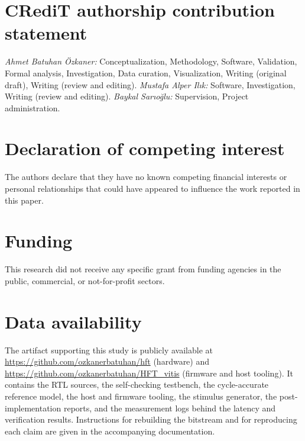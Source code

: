 \documentclass[final,5p,times,twocolumn]{elsarticle}
\begin{document}

\section*{CRediT authorship contribution statement}
\noindent
\textit{Ahmet Batuhan \"Ozkaner:} Conceptualization, Methodology, Software,
Validation, Formal analysis, Investigation, Data curation, Visualization,
Writing (original draft), Writing (review and editing).
\textit{Mustafa Alper Il{\i}k:} Software, Investigation,
Writing (review and editing).
\textit{Baykal Sar{\i}o\u{g}lu:} Supervision, Project administration.

\section*{Declaration of competing interest}
The authors declare that they have no known competing financial interests or
personal relationships that could have appeared to influence the work reported
in this paper.

\section*{Funding}
This research did not receive any specific grant from funding agencies in the
public, commercial, or not-for-profit sectors.

\section*{Data availability}
The artifact supporting this study is publicly available at
\url{https://github.com/ozkanerbatuhan/hft} (hardware) and
\url{https://github.com/ozkanerbatuhan/HFT_vitis} (firmware and host tooling).
It contains the RTL sources, the self-checking
testbench, the cycle-accurate reference model, the host and firmware tooling, the
stimulus generator, the post-implementation reports, and the measurement logs
behind the latency and verification results. Instructions for rebuilding the
bitstream and for reproducing each claim are given in the accompanying
documentation.



\end{document}
